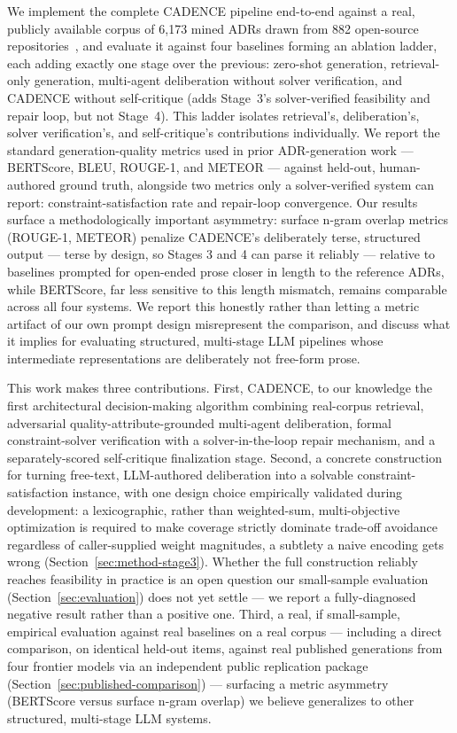 \documentclass[lettersize,journal]{IEEEtran}
\begin{document}
We implement the complete CADENCE pipeline end-to-end against a real, publicly available corpus of 6{,}173 mined ADRs drawn from 882 open-source repositories~\cite{buchgeher2023adr}, and evaluate it against four baselines forming an ablation ladder, each adding exactly one stage over the previous: zero-shot generation, retrieval-only generation, multi-agent deliberation without solver verification, and CADENCE without self-critique (adds Stage~3's solver-verified feasibility and repair loop, but not Stage~4). This ladder isolates retrieval's, deliberation's, solver verification's, and self-critique's contributions individually. We report the standard generation-quality metrics used in prior ADR-generation work --- BERTScore, BLEU, ROUGE-1, and METEOR --- against held-out, human-authored ground truth, alongside two metrics only a solver-verified system can report: constraint-satisfaction rate and repair-loop convergence. Our results surface a methodologically important asymmetry: surface n-gram overlap metrics (ROUGE-1, METEOR) penalize CADENCE's deliberately terse, structured output --- terse by design, so Stages 3 and 4 can parse it reliably --- relative to baselines prompted for open-ended prose closer in length to the reference ADRs, while BERTScore, far less sensitive to this length mismatch, remains comparable across all four systems. We report this honestly rather than letting a metric artifact of our own prompt design misrepresent the comparison, and discuss what it implies for evaluating structured, multi-stage LLM pipelines whose intermediate representations are deliberately not free-form prose.

This work makes three contributions. First, CADENCE, to our knowledge the first architectural decision-making algorithm combining real-corpus retrieval, adversarial quality-attribute-grounded multi-agent deliberation, formal constraint-solver verification with a solver-in-the-loop repair mechanism, and a separately-scored self-critique finalization stage. Second, a concrete construction for turning free-text, LLM-authored deliberation into a solvable constraint-satisfaction instance, with one design choice empirically validated during development: a lexicographic, rather than weighted-sum, multi-objective optimization is required to make coverage strictly dominate trade-off avoidance regardless of caller-supplied weight magnitudes, a subtlety a naive encoding gets wrong (Section~\ref{sec:method-stage3}). Whether the full construction reliably reaches feasibility in practice is an open question our small-sample evaluation (Section~\ref{sec:evaluation}) does not yet settle --- we report a fully-diagnosed negative result rather than a positive one. Third, a real, if small-sample, empirical evaluation against real baselines on a real corpus --- including a direct comparison, on identical held-out items, against real published generations from four frontier models via an independent public replication package (Section~\ref{sec:published-comparison}) --- surfacing a metric asymmetry (BERTScore versus surface n-gram overlap) we believe generalizes to other structured, multi-stage LLM systems.
\end{document}
